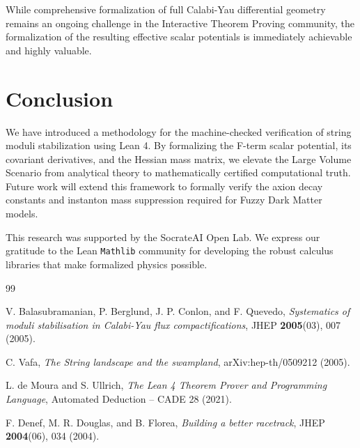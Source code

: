 \documentclass[aps,prd,twocolumn,nofootinbib,superscriptaddress,10pt]{revtex4-2}
\begin{document}
While comprehensive formalization of full Calabi-Yau differential geometry remains an ongoing challenge in the Interactive Theorem Proving community, the formalization of the resulting effective scalar potentials is immediately achievable and highly valuable. 

\section{Conclusion}

We have introduced a methodology for the machine-checked verification of string moduli stabilization using Lean 4. By formalizing the F-term scalar potential, its covariant derivatives, and the Hessian mass matrix, we elevate the Large Volume Scenario from analytical theory to mathematically certified computational truth. Future work will extend this framework to formally verify the axion decay constants and instanton mass suppression required for Fuzzy Dark Matter models.

\begin{acknowledgments}
This research was supported by the SocrateAI Open Lab. We express our gratitude to the Lean \texttt{Mathlib} community for developing the robust calculus libraries that make formalized physics possible.
\end{acknowledgments}


\begin{thebibliography}{99}

V. Balasubramanian, P. Berglund, J. P. Conlon, and F. Quevedo,
\textit{Systematics of moduli stabilisation in Calabi-Yau flux compactifications},
JHEP \textbf{2005}(03), 007 (2005).

C. Vafa, 
\textit{The String landscape and the swampland},
arXiv:hep-th/0509212 (2005).

L. de Moura and S. Ullrich,
\textit{The Lean 4 Theorem Prover and Programming Language},
Automated Deduction -- CADE 28 (2021).

F. Denef, M. R. Douglas, and B. Florea,
\textit{Building a better racetrack},
JHEP \textbf{2004}(06), 034 (2004).

\end{thebibliography}
\end{document}
